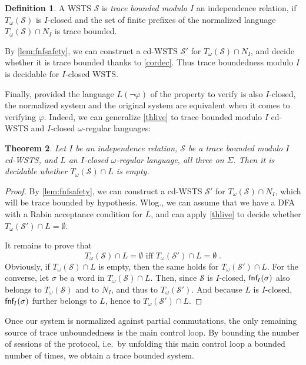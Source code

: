 \documentclass[11pt,reqno,a4paper]{amsart}
\theoremstyle{plain}
\newtheorem{theorem}{Theorem}
\theoremstyle{definition}
\newtheorem{definition}[theorem]{Definition}
\theoremstyle{remark}
\begin{document}
\begin{definition}\label{defmod}A WSTS $\mathcal{S}$ is \emph{trace bounded modulo $I$} an
  independence relation, if $T_\omega(\mathcal{S})$ is $I$-closed and
  the set of finite prefixes of the normalized language
  $T_\omega(\mathcal{S})\cap N_I$ is trace bounded.
\end{definition}
By \autoref{lem:fnfsafety}, we can construct a cd-WSTS $\mathcal{S}'$
for $T_\omega(\mathcal{S})\cap N_I$, and decide whether it is trace
bounded thanks to \autoref{cordec}.  Thus trace boundedness modulo $I$
is decidable for $I$-closed WSTS.

Finally, provided the language $L(\neg\varphi)$ of the property to
verify is also $I$-closed, the normalized system and the original
system are equivalent when it comes to verifying $\varphi$.  Indeed,
we can generalize \autoref{thlive} to trace bounded modulo $I$
cd-WSTS and $I$-closed $\omega$-regular languages:
\begin{theorem}\label{propmod}Let $I$ be an independence relation, $\mathcal{S}$ be a trace bounded
  modulo $I$ cd-WSTS, and $L$ an $I$-closed $\omega$-regular language,
  all three on $\Sigma$.  Then it is decidable whether
  $T_\omega(\mathcal{S})\cap L$ is empty.
\end{theorem}
\begin{proof}
  By \autoref{lem:fnfsafety}, we can construct a cd-WSTS
  $\mathcal{S}'$ for $T_\omega(\mathcal{S})\cap N_I$, which will be
  trace bounded by hypothesis.  Wlog., we can assume that we have a DFA
  with a Rabin acceptance condition for $L$, and can apply
  \autoref{thlive} to decide whether $T_\omega(\mathcal{S}')\cap
  L=\emptyset$.
  
  It remains to prove that
  \begin{equation*}
  T_\omega(\mathcal{S})\cap L=\emptyset\text{  iff 
  }T_\omega(\mathcal{S}')\cap L=\emptyset\;.
  \end{equation*}
  Obviously, if $T_\omega(\mathcal{S})\cap L$ is empty, then the same
  holds for $T_\omega(\mathcal{S}')\cap L$.  For the converse, let
  $\sigma$ be a word in $T_\omega(\mathcal{S})\cap L$.  Then, since
  $\mathcal{S}$ is $I$-closed, $\mathsf{fnf}_{\!I}(\sigma)$ also belongs to
  $T_\omega(\mathcal{S})$ and to $N_I$, and thus to
  $T_\omega(\mathcal{S}')$.  And because $L$ is $I$-closed,
  $\mathsf{fnf}_{\!I}(\sigma)$ further belongs to $L$, hence to
  $T_\omega(\mathcal{S}')\cap L$.
\end{proof}

Once our system is normalized against partial commutations, the only
remaining source of trace unboundedness is the main control loop.  By
bounding the number of sessions of the protocol, i.e.\ by unfolding
this main control loop a bounded number of times, we obtain a trace
bounded system.
\end{document}

